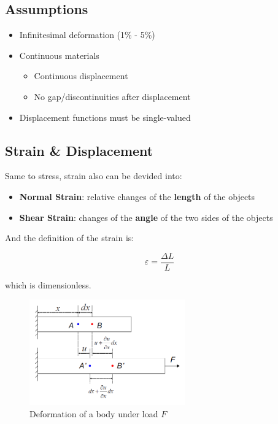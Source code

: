 \documentclass[en,hazy,cyan,8pt,normal]{elegantnote}
\numberwithin{equation}{section}
\begin{document}
  \subsection{Assumptions}\label{subsec:02.01}
    \begin{itemize}
      \item Infinitesimal deformation (1\% - 5\%)
      \item Continuous materials
      \begin{itemize}
        \item Continuous displacement
        \item No gap/discontinuities after displacement
      \end{itemize}
      \item Displacement functions must be single-valued
    \end{itemize}

  \subsection{Strain \& Displacement}\label{subsec:02.02}
    Same to stress, strain also can be devided into:

    \begin{itemize}
      \item \textbf{Normal Strain}: relative changes of the \textbf{length} of the objects
      \item \textbf{Shear Strain}: changes of the \textbf{angle} of the two sides of the objects
    \end{itemize}

    And the definition of the strain is:

    \begin{equation}\label{eq:033}
      \varepsilon=\frac{\Delta L}{L}
    \end{equation}

    which is dimensionless.

    \begin{figure}[H]
      \centering
      \includegraphics[width=0.6\textwidth]{image/010.png}
      \caption{Deformation of a body under load $F$}
      \label{fig:010}
    \end{figure}
\end{document}

